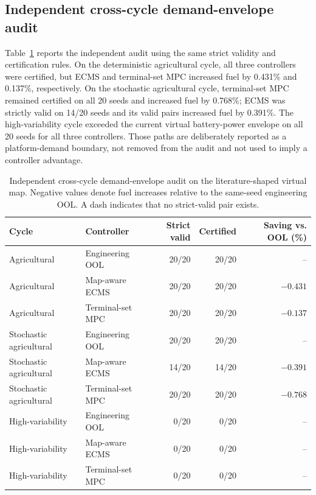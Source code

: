 \documentclass[energies,article,submit,moreauthors]{Definitions/mdpi}
\begin{document}
\subsection{Independent cross-cycle demand-envelope audit}
Table~\ref{tab:cross-cycle} reports the independent audit using the same strict validity and certification rules. On the deterministic agricultural cycle, all three controllers were certified, but ECMS and terminal-set MPC increased fuel by 0.431\% and 0.137\%, respectively. On the stochastic agricultural cycle, terminal-set MPC remained certified on all 20 seeds and increased fuel by 0.768\%; ECMS was strictly valid on 14/20 seeds and its valid pairs increased fuel by 0.391\%. The high-variability cycle exceeded the current virtual battery-power envelope on all 20 seeds for all three controllers. Those paths are deliberately reported as a platform-demand boundary, not removed from the audit and not used to imply a controller advantage.

\begin{table}[H]
\centering
\caption{Independent cross-cycle demand-envelope audit on the literature-shaped virtual map. Negative values denote fuel increases relative to the same-seed engineering OOL. A dash indicates that no strict-valid pair exists.}
\label{tab:cross-cycle}
\scriptsize
\setlength{\tabcolsep}{3pt}
\begin{tabular}{llrrr}
\toprule
Cycle & Controller & Strict valid & Certified & Saving vs. OOL (\%) \\
\midrule
Agricultural & Engineering OOL & 20/20 & 20/20 & -- \\
Agricultural & Map-aware ECMS & 20/20 & 20/20 & $-0.431$ \\
Agricultural & Terminal-set MPC & 20/20 & 20/20 & $-0.137$ \\
Stochastic agricultural & Engineering OOL & 20/20 & 20/20 & -- \\
Stochastic agricultural & Map-aware ECMS & 14/20 & 14/20 & $-0.391$ \\
Stochastic agricultural & Terminal-set MPC & 20/20 & 20/20 & $-0.768$ \\
High-variability & Engineering OOL & 0/20 & 0/20 & -- \\
High-variability & Map-aware ECMS & 0/20 & 0/20 & -- \\
High-variability & Terminal-set MPC & 0/20 & 0/20 & -- \\
\bottomrule
\end{tabular}
\end{table}
\end{document}
